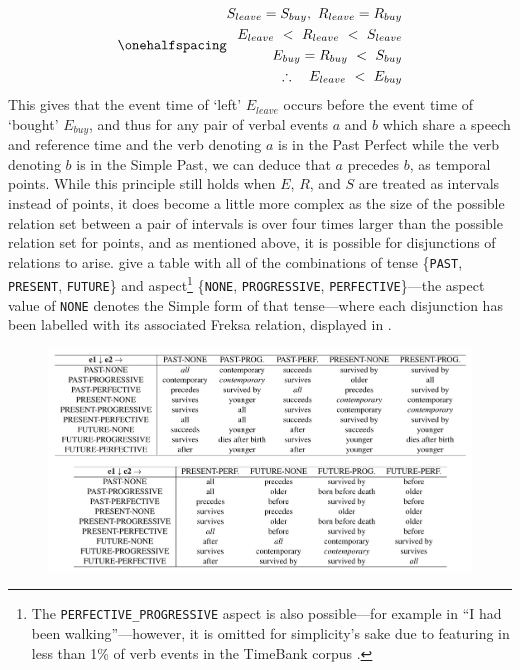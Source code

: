 \documentclass[a4paper,12pt,leqno,twoside]{article}
\begin{document}
\begin{subequations}\label{ex:permanent-ref}
	\onehalfspacing
	\begin{align}
		S_{leave} = S_{buy},~ R_{leave} = R_{buy}\\
		E_{leave} ~<~ R_{leave} ~<~ S_{leave}\\
		E_{buy} = R_{buy} ~<~ S_{buy}\\
		\therefore~~~ E_{leave} ~<~ E_{buy}
	\end{align}
\end{subequations}
This gives that the event time of `left' $E_{leave}$ occurs before the event time of `bought' $E_{buy}$, and thus for any pair of verbal events $a$ and $b$ which share a speech and reference time and the verb denoting $a$ is in the Past Perfect while the verb denoting $b$ is in the Simple Past, we can deduce that $a$ precedes $b$, as temporal points. While this principle still holds when $E$, $R$, and $S$ are treated as intervals instead of points, it does become a little more complex as the size of the possible relation set between a pair of intervals is over four times larger than the possible relation set for points, and as mentioned above, it is possible for disjunctions of relations to arise. \citet{Derczynski2013} give a table with all of the combinations of tense \{\texttt{PAST}, \texttt{PRESENT}, \texttt{FUTURE}\} and aspect\footnote{The \texttt{PERFECTIVE\_PROGRESSIVE} aspect is also possible---for example in ``I had been walking''---however, it is omitted for simplicity's sake due to featuring in less than 1\% of verb events in the TimeBank corpus \citep[p. 77]{Derczynski2013}.} \{\texttt{NONE}, \texttt{PROGRESSIVE}, \texttt{PERFECTIVE}\}---the aspect value of \texttt{NONE} denotes the Simple form of that tense---where each disjunction has been labelled with its associated Freksa relation, displayed in .
\begin{center}
	\begin{figure}[h!]
		\includegraphics[width=\textwidth]{images/tense-aspect-freksa}
		\label{fig:tense-aspect-freksa}
	\end{figure}
\end{center}
\end{document}
